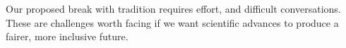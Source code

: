 \documentclass[nonacm,sigconf,review,balance=false]{acmart}
\begin{document}
Our proposed break with tradition requires effort, and difficult conversations. These are challenges worth facing if we want scientific advances to produce a fairer, more inclusive future.





\end{document}
